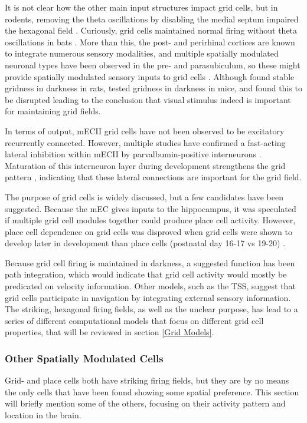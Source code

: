\documentclass{article}
\begin{document}
    It is not clear how the other main input structures impact grid cells, but in rodents, removing the theta oscillations by disabling the medial septum impaired the hexagonal field \parencite{Brandon2011,Koenig2011}. Curiously, grid cells maintained normal firing without theta oscillations in bats \parencite{Yartsev2011}. More than this, the post- and perirhinal cortices are known to integrate numerous sensory modalities, and multiple spatially modulated neuronal types have been observed in the pre- and parasubiculum, so these might provide spatially modulated sensory inputs to grid cells \parencite{Furtak2007,Groen1990}. Although \cite{Hafting2005} found stable gridness in darkness in rats, \cite{Chen2016} tested gridness in darkness in mice, and found this to be disrupted leading to the conclusion that visual stimulus indeed is important for maintaining grid fields.

    In terms of output, mECII grid cells have not been observed to be excitatory recurrently connected. However, multiple studies have confirmed a fast-acting lateral inhibition within mECII by parvalbumin-positive interneurons \parencite{Couey2013,Buetfering2014}. Maturation of this interneuron layer during development strengthens the grid pattern \parencite{Christensen2021}, indicating that these lateral connections are important for the grid field.

    The purpose of grid cells is widely discussed, but a few candidates have been suggested. Because the mEC gives inputs to the hippocampus, it was speculated if multiple grid cell modules together could produce place cell activity. However, place cell dependence on grid cells was disproved when grid cells were shown to develop later in development than place cells (postnatal day 16-17 vs 19-20) \parencite{Langston2010,Wills2010,Wills2012}.

    Because grid cell firing is maintained in darkness, a suggested function has been path integration, which would indicate that grid cell activity would mostly be predicated on velocity information. Other models, such as the TSS, suggest that grid cells participate in navigation by integrating external sensory information. The striking, hexagonal firing fields, as well as the unclear purpose, has lead to a series of different computational models that focus on different grid cell properties, that will be reviewed in section \ref{Grid Models}.

    \subsubsection{Other Spatially Modulated Cells}
    Grid- and place cells both have striking firing fields, but they are by no means the only cells that have been found showing some spatial preference. This section will briefly mention some of the others, focusing on their activity pattern and location in the brain.
    
\end{document}
